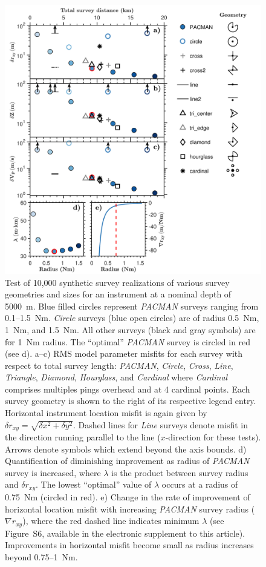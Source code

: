 \documentclass[10pt,titlepage]{article}
\providecommand{\DIFaddtex}[1]{{\protect\color{blue}\uwave{#1}}} %
\providecommand{\DIFdeltex}[1]{{\protect\color{red}\sout{#1}}}                      %
\providecommand{\DIFaddFL}[1]{\DIFadd{#1}} %
\providecommand{\DIFdelFL}[1]{\DIFdel{#1}} %
\providecommand{\DIFaddbeginFL}{} %
\providecommand{\DIFaddendFL}{} %
\providecommand{\DIFdelbeginFL}{} %
\providecommand{\DIFdelendFL}{} %
\providecommand{\DIFadd}[1]{\texorpdfstring{\DIFaddtex{#1}}{#1}} %
\providecommand{\DIFdel}[1]{\texorpdfstring{\DIFdeltex{#1}}{}} %
\begin{document}
\begin{figure}[h]
\includegraphics[trim=0cm 0cm 0cm 0cm,clip=true,width=\columnwidth]{Figure06_z5000m.pdf}
\caption{ Test of 10,000 synthetic survey realizations of various survey geometries and sizes for an instrument at a nominal depth of 5000~m. Blue filled circles represent \textit{PACMAN} surveys ranging from 0.1--1.5~Nm. \textit{Circle} surveys (blue open circles) are of radius 0.5~Nm, 1~Nm, and 1.5~Nm. All other surveys (black and gray symbols) are \DIFdelbeginFL \DIFdelFL{for }\DIFdelendFL \DIFaddbeginFL \DIFaddFL{at }\DIFaddendFL 1~Nm radius. The ``optimal'' \textit{PACMAN} survey is circled in red (see d). a--c) RMS model parameter misfits for each survey \DIFaddbeginFL \DIFaddFL{type }\DIFaddendFL with respect to total survey length: \textit{PACMAN}, \textit{Circle}, \textit{Cross}, \textit{Line}, \textit{Triangle}, \textit{Diamond}, \textit{Hourglass}, and \textit{Cardinal} where \textit{Cardinal} comprises multiples pings overhead and at 4 cardinal points. Each survey geometry is shown to the right of its respective legend entry. Horizontal instrument location misfit is again given by $\delta r_{xy} = \sqrt{\delta x^2 + \delta y^2} $. Dashed lines for \textit{Line} surveys denote misfit in the direction running parallel to the line ($x$-direction for these tests). Arrows denote symbols which extend beyond the axis bounds. d) Quantification of diminishing improvement as radius of \textit{PACMAN} survey is increased, where $\lambda$ is the product between survey radius and $\delta r_{xy}$. The lowest ``optimal'' value of $\lambda$ occurs at a radius of 0.75~Nm (circled in red). e) Change in the rate of improvement of horizontal location misfit with increasing \textit{PACMAN} survey radius ($\nabla r_{xy}$), where the red dashed line indicates minimum $\lambda$ (see Figure~S6, available in the electronic supplement to this article). Improvements in horizontal misfit become small as radius increases beyond 0.75--1~Nm.}

\end{figure}
\end{document}
